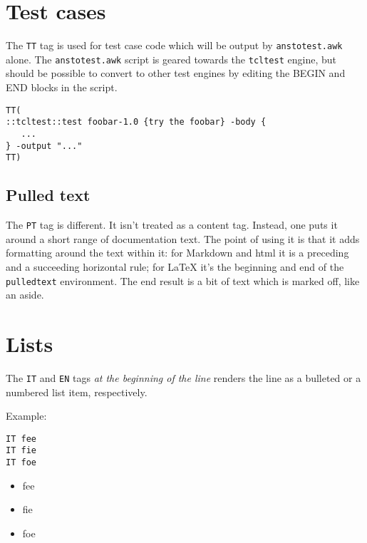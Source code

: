 \section{Test cases}
\label{test-cases}

The \texttt{TT} tag is used for test case code which will be output by \texttt{anstotest.awk} alone. The \texttt{anstotest.awk} script is geared towards the \texttt{tcltest} engine, but should be possible to convert to other test engines by editing the BEGIN and END blocks in the script.

\begin{verbatim}
TT(
::tcltest::test foobar-1.0 {try the foobar} -body {
   ...
} -output "..."
TT)
\end{verbatim}

\begin{pulledtext}
\section{Pulled text}
\label{pulled-text}

The \texttt{PT} tag is different. It isn't treated as a content tag. Instead, one puts it around a short range of documentation text. The point of using it is that it adds formatting around the text within it: for Markdown and html it is a preceding and a succeeding horizontal rule; for \LaTeX{} it's the beginning and end of the \texttt{pulledtext} environment. The end result is a bit of text which is marked off, like an aside.

\end{pulledtext}

\section{Lists}
\label{lists}

The \texttt{IT} and \texttt{EN} tags \emph{at the beginning of the line} renders the line as a bulleted or a numbered list item, respectively.


Example:

\begin{verbatim}
IT fee
IT fie
IT foe
\end{verbatim}
\begin{itemize}
\item  fee
\item  fie
\item  foe
\end{itemize}

